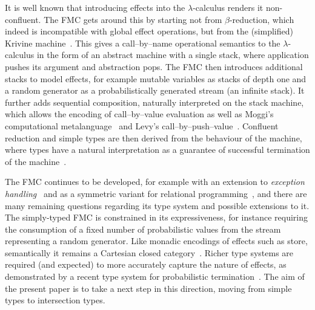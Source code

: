 \documentclass[a4paper,UKenglish,cleveref, autoref, thm-restate]{lipics-v2021}
\begin{document}
It is well known that introducing effects into the $\lambda$-calculus renders it non-confluent. The FMC gets around this by starting not from $\beta$-reduction, which indeed is incompatible with global effect operations, but from the (simplified) Krivine machine~\cite{Krivine-2007}. This gives a call--by--name operational semantics to the $\lambda$-calculus in the form of an abstract machine with a single stack, where application pushes its argument and abstraction pops. The FMC then introduces additional stacks to model effects, for example mutable variables as stacks of depth one and a random generator as a probabilistically generated stream (an infinite stack). It further adds sequential composition, naturally interpreted on the stack machine, which allows the encoding of call--by--value evaluation as well as Moggi's computational metalanguage~\cite{Moggi-1991} and Levy's call--by--push--value~\cite{Levy-2003}. Confluent reduction and simple types are then derived from the behaviour of the machine, where types have a natural interpretation as a guarantee of successful termination of the machine~\cite{Heijltjes-2022}.

The FMC continues to be developed, for example with an extension to \emph{exception handling}~\cite{Heijltjes-2025} and as a symmetric variant for relational programming~\cite{Barrett-Castle-Heijltjes-2024}, and there are many remaining questions regarding its type system and possible extensions to it. The simply-typed FMC is constrained in its expressiveness, for instance requiring the consumption of a fixed number of probabilistic values from the stream representing a random generator. Like monadic encodings of effects such as store, semantically it remains a Cartesian closed category~\cite{Barrett-Heijltjes-McCusker-2023}. Richer type systems are required (and expected) to more accurately capture the nature of effects, as demonstrated by a recent type system for probabilistic termination~\cite{Heijltjes-Majury-2025}. The aim of the present paper is to take a next step in this direction, moving from simple types to intersection types.
\end{document}

